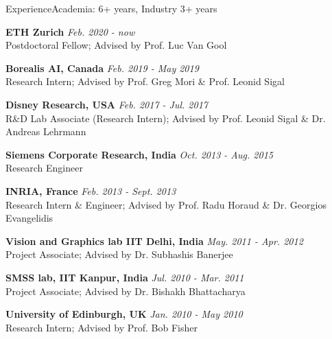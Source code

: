 \documentclass{resume_long} %
\begin{document}

\begin{rSection}{Experience}{\quad Academia: 6+ years, Industry 3+ years}

    {\bf \footnotesize{ETH Zurich}} \hfill {\em \footnotesize{Feb. 2020 - now}} 
    \\ \footnotesize{Postdoctoral Fellow}; \footnotesize{Advised by Prof. Luc Van Gool}
        
    {\bf \footnotesize{Borealis AI, Canada}} \hfill {\em \footnotesize{Feb. 2019 - May 2019}} 
    \\ \footnotesize{Research Intern}; \footnotesize{Advised by Prof. Greg Mori \& Prof. Leonid Sigal}
    
    {\bf \footnotesize{Disney Research, USA}} \hfill {\em \footnotesize{Feb. 2017 - Jul. 2017}} 
    \\ \footnotesize{R\&D Lab Associate (Research Intern)}; \footnotesize{Advised by Prof. Leonid Sigal \& Dr. Andreas Lehrmann}
    
    {\bf \footnotesize{Siemens Corporate Research, India}} \hfill {\em \footnotesize{Oct. 2013 - Aug. 2015}} 
    \\ \footnotesize{Research Engineer}
    
    {\bf INRIA, France} \hfill {\em Feb. 2013 - Sept. 2013} 
    \\ \footnotesize{Research Intern \& Engineer}; \footnotesize{Advised by Prof. Radu Horaud \& Dr. Georgios Evangelidis}
    
    {\bf \footnotesize{Vision and Graphics lab IIT Delhi, India}} \hfill {\em \footnotesize{May. 2011 - Apr. 2012}} 
    \\ \footnotesize{Project Associate}; \footnotesize{Advised by Dr. Subhashis Banerjee}
    
    {\bf \footnotesize{SMSS lab, IIT Kanpur, India}} \hfill {\em \footnotesize{Jul. 2010 - Mar. 2011}} 
    \\ \footnotesize{Project Associate}; \footnotesize{Advised by Dr. Bishakh Bhattacharya}

    {\bf \footnotesize{University of Edinburgh, UK}} \hfill {\em \footnotesize{Jan. 2010 - May 2010}} 
    \\ \footnotesize{Research Intern}; \footnotesize{Advised by Prof. Bob Fisher}
\end{rSection}
\end{document}
